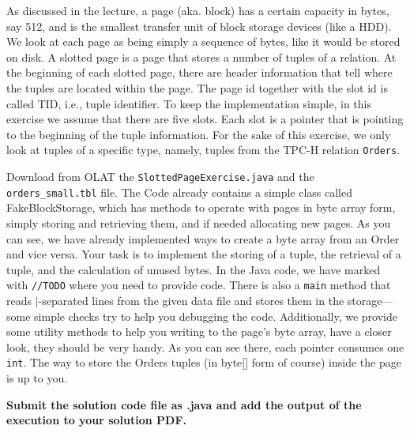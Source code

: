 



\newcommand{\subtitle}{\textbf{Exercise 1}}
\newcommand{\outdate}{25.10.2021}
\newcommand{\duedate}{01.11.2021 16:00 CET}
\newcommand{\video}{004}






As discussed in the lecture, a page (aka. block) has a certain capacity in bytes, say 512, and is the smallest transfer unit of block storage devices (like a HDD). 
We look at each page as being simply a sequence of bytes, like it would be stored on disk. 
A slotted page is a page that stores a number of tuples of a relation. 
At the beginning of each slotted page, there are header information that tell where the tuples are located within the page. The page id together with the slot id is called TID, i.e., tuple identifier. 
To keep the implementation simple, in this exercise we assume that there are five slots. 
Each slot is a pointer that is pointing to the beginning of the tuple information. 
For the sake of this exercise, we only look at tuples of a specific type, namely, tuples from the TPC-H relation {\tt Orders}.

Download from OLAT the {\tt SlottedPageExercise.java} and the {\tt orders\_small.tbl} file.
The Code already contains a simple class called FakeBlockStorage, which has methods to operate with pages in byte array form, simply storing and retrieving them, and if needed allocating new pages. 
As you can see, we have already implemented ways to create a byte array from an Order and vice versa. Your task is to implement the storing of a tuple, the retrieval of a tuple, and the calculation of unused bytes. In the Java code, we have marked with {\tt //TODO} where you need to provide code.
There is also a {\tt main} method that reads $|$-separated lines from the given data file and stores them in the storage---some simple checks try to help you debugging the code.
Additionally, we provide some utility methods to help you writing to the page's byte array, have a closer look, they should be very handy.
As you can see there, each pointer consumes one {\tt int}. The way to store the Orders tuples (in byte[] form of course) inside the page is up to you. 

\textbf{Submit the solution code file as .java and add the output of the execution to your solution PDF.}

